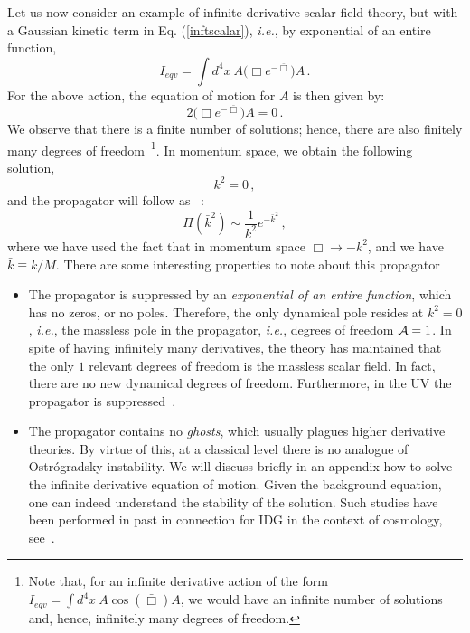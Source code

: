 \documentclass[a4paper,12pt]{article}
\newcommand{\bbox}{\bar{\Box}}
\newcommand{\+}{^{\dagger}}
\newcommand{\kb}{\bar{k}}
\newcommand{\2}{\frac{1}{2}}
\newcommand{\3}{\frac{1}{3}}
\newcommand{\4}{\frac{1}{4}}
\newcommand{\6}{\frac{1}{6}}
\newcommand{\8}{\frac{1}{8}}
\begin{document}
Let us now consider an example of infinite derivative scalar field theory, but with a Gaussian kinetic term in Eq. (\ref{inftscalar}), \textit{i.e.}, 
by exponential of an entire function,  
\begin{equation}
\label{action-entire}
I_{eqv}=\int d^{4} x~A\bigg(\Box e^{-\bbox}\bigg)A\,.
\end{equation}
For the above action, the equation of motion for $A$ is then given by:
\begin{equation}
2\bigg(\Box e^{-\bbox}\bigg)A=0\,.
\end{equation}
We observe that there is a finite number of solutions; hence, there are also finitely many degrees of freedom~\footnote{Note that, for an infinite derivative action of the form $I_{eqv}=\int d^{4} x~A\cos (\bbox) A$, we would have an infinite number of solutions and, hence, infinitely many degrees of freedom.}. In momentum space, we obtain the following solution, 
\begin{equation}
k^{2}=0\,,
\end{equation}
and the propagator will follow as~\cite{Biswas:2011ar,Biswas:2013kla} :
\begin{equation}
\Pi(\kb^2)\sim \frac{1}{k^{2}}e^{-\kb^2}\,,
\end{equation}
where we have used the fact that in momentum space $\Box\rightarrow -k^2$, and
we have $\bar{k}\equiv k/M$. There are some interesting properties to note about this propagator  

\begin{itemize}

\item{The propagator is suppressed by an {\it exponential of an entire function}, which has no zeros, or no poles. 
Therefore, the only dynamical pole resides at $k^{2}=0$, \textit{i.e.}, the massless pole in the propagator, \textit{i.e.}, degrees of freedom ${\cal A} =1$. In spite of having infinitely many derivatives, the theory has maintained that the only $1$ relevant degrees of freedom is the massless scalar field. In fact, there are 
no new dynamical degrees of freedom. Furthermore, in the UV the propagator is suppressed~\cite{Talaganis:2014ida}. }

\item{The propagator contains no {\it ghosts}, which usually plagues higher derivative theories. By virtue of this, at a classical 
level there is no analogue of Ostr\'ogradsky instability. We will discuss briefly in an appendix how to solve the infinite derivative 
equation of motion. Given the background equation, one can indeed understand the stability of the solution. Such studies have been 
performed in past in connection for IDG in the context of cosmology, see~\cite{Biswas:2010zk,Biswas:2012bp}.}

\end{itemize}
\end{document}
